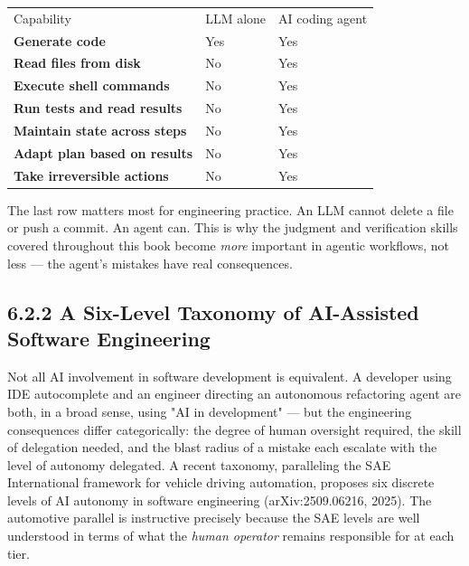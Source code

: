 \documentclass[11pt,a4paper]{book}
\begin{document}
\begin{tabular}{lll}
\hline
Capability & LLM alone & AI coding agent \\
\textbf{Generate code} & Yes & Yes \\
\textbf{Read files from disk} & No & Yes \\
\textbf{Execute shell commands} & No & Yes \\
\textbf{Run tests and read results} & No & Yes \\
\textbf{Maintain state across steps} & No & Yes \\
\textbf{Adapt plan based on results} & No & Yes \\
\textbf{Take irreversible actions} & No & Yes \\
\hline
\end{tabular}

The last row matters most for engineering practice. An LLM cannot delete a file or push a commit. An agent can. This is why the judgment and verification skills covered throughout this book become \textit{more} important in agentic workflows, not less --- the agent's mistakes have real consequences.

\subsection{6.2.2 A Six-Level Taxonomy of AI-Assisted Software Engineering}

Not all AI involvement in software development is equivalent. A developer using IDE autocomplete and an engineer directing an autonomous refactoring agent are both, in a broad sense, using "AI in development" --- but the engineering consequences differ categorically: the degree of human oversight required, the skill of delegation needed, and the blast radius of a mistake each escalate with the level of autonomy delegated. A recent taxonomy, paralleling the SAE International framework for vehicle driving automation, proposes six discrete levels of AI autonomy in software engineering (arXiv:2509.06216, 2025). The automotive parallel is instructive precisely because the SAE levels are well understood in terms of what the \textit{human operator} remains responsible for at each tier.
\end{document}

